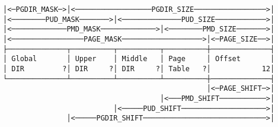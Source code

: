 \documentclass[varwidth=40em]{standalone}
\begin{document}
\begin{verbatim}
│<─PGDIR_MASK─>│<──────────────────PGDIR_SIZE─────────────────>│
│<────────PUD_MASK───────>│<──────────────PUD_SIZE────────────>│
│<─────────────PMD_MASK─────────────>│<────────PMD_SIZE───────>│
│<─────────────────PAGE_MASK───────────────────>│<─PAGE_SIZE──>│
├──────────────┬──────────┬──────────┬──────────┼──────────────┤
│ Global       │ Upper    │ Middle   │ Page     │ Offset       │
│ DIR         ?│ DIR     ?│ DIR     ?│ Table   ?│            12│
└──────────────┴──────────┴──────────┴──────────┼──────────────┤
                                                │<─PAGE_SHIFT─>│
                                     │<───PMD_SHIFT───────────>│
                          │<─────PUD_SHIFT────────────────────>│
               │<─────PGDIR_SHIFT─────────────────────────────>│
\end{verbatim}
\end{document}
